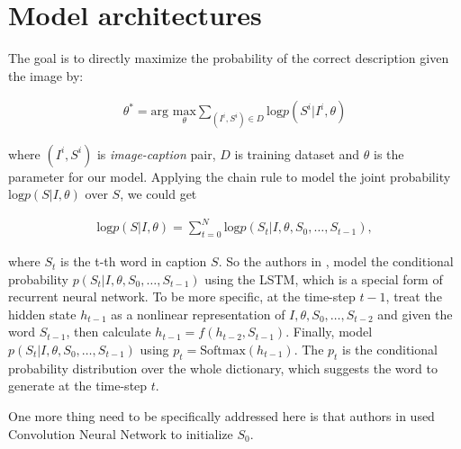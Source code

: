 \documentclass[fleqn,10pt]{SelfArx} %
\begin{document}

\section{Model architectures}

The goal is to directly maximize the probability of the correct description given the image by:

\begin{align}
\theta^* = \text{arg } \underset{\theta}{\text{max}} \underset{(I^i,S^i)\in D}{\sum} \text{log}p(S^i|I^i,\theta)
\end{align}

where $(I^i,S^i)$ is \textit{image-caption} pair, $D$ is training dataset and $\theta$ is the parameter for our model. Applying the chain rule to model the joint probability $\text{log}p(S|I,\theta)$ over $S$, we could get

\begin{align}
\text{log}p(S|I,\theta) = \sum_{t=0}^N \text{log} p(S_t|I, \theta, S_0, \ldots, S_{t-1}),
\end{align}

where $S_t$ is the t-th word in caption $S$. So the authors in \cite{vinyals2015show}, model the conditional probability $p(S_t|I, \theta, S_0, \ldots, S_{t-1})$ using the LSTM, which is a special form of recurrent neural network. To be more specific, at the time-step $t-1$, treat the hidden state $h_{t-1}$ as a nonlinear representation of $I, \theta, S_0, \ldots, S_{t-2}$ and given the word $S_{t-1}$, then calculate $h_{t-1} = f(h_{t-2}, S_{t-1})$. Finally, model $p(S_t|I, \theta, S_0, \ldots, S_{t-1})$ using
$p_{t} = \text{Softmax}(h_{t-1})$. The $p_t$ is the conditional probability distribution over the whole dictionary, which suggests the word to generate at the time-step $t$.

One more thing need to be specifically addressed here is that authors in  \cite{vinyals2015show} used Convolution Neural Network to initialize $S_0$.

\end{document}
